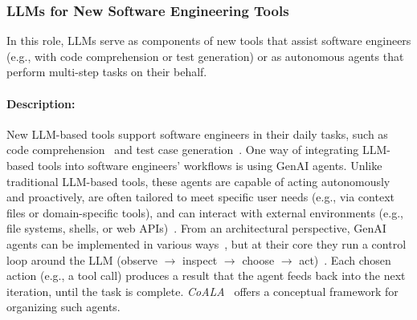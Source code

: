 \documentclass[smallextended]{svjour3}
\newcommand{\studytypesubsection}[1]{\subsubsection{#1}}
\newcommand{\studytypeparagraph}[1]{\paragraph{\bfseries #1:}}
\newcommand{\studytypesubsection}[1]{\subsection{#1}}
\newcommand{\studytypeparagraph}[1]{\subsubsection{#1}}
\begin{document}
\studytypesubsection{LLMs for New Software Engineering Tools}
\label{sec:llms-for-new-software-engineering-tools}

In this role, LLMs serve as components of new tools that assist software engineers (e.g., with code comprehension or test generation) or as autonomous agents that perform multi-step tasks on their behalf.

\studytypeparagraph{Description}

New LLM-based tools support software engineers in their daily tasks, such as code comprehension~\cite{DBLP:conf/chi/YanHWH24} and test case generation~\cite{DBLP:journals/tse/SchaferNET24}.
One way of integrating LLM-based tools into software engineers' workflows is using GenAI agents.
Unlike traditional LLM-based tools, these agents are capable of acting autonomously and proactively, are often tailored to meet specific user needs (e.g., via context files or domain-specific tools), and can interact with external environments (e.g., file systems, shells, or web APIs)~\cite{wiesinger2025agents,yang2025code}.
From an architectural perspective, GenAI agents can be implemented in various ways~\cite{wiesinger2025agents}, but at their core they run a control loop around the LLM (observe $\rightarrow$ inspect $\rightarrow$ choose $\rightarrow$ act)~\cite{raschka2026components}.
Each chosen action (e.g., a tool call) produces a result that the agent feeds back into the next iteration, until the task is complete.
\emph{CoALA}~\cite{DBLP:journals/tmlr/SumersYN024} offers a conceptual framework for organizing such agents.
\end{document}
